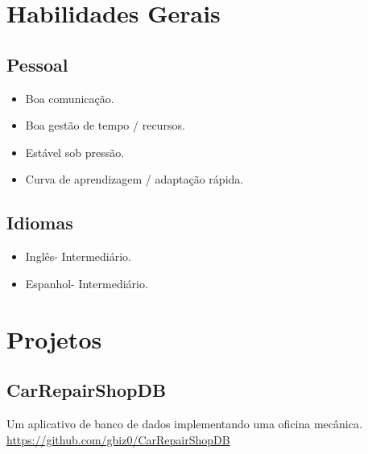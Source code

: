 \documentclass[16pt]{article}
\begin{document}
  \section{Habilidades Gerais}
    \begin{minipage}[t]{0.47\linewidth}
      \subsection{Pessoal}
        \begin{itemize}
          \item{Boa comunicação.}
          \item{Boa gestão de tempo / recursos.}
          \item{Estável sob pressão.}
          \item{Curva de aprendizagem / adaptação rápida.}
        \end{itemize}
    \end{minipage}
    \hfill\vline\hfill
    \begin{minipage}[t]{0.5\linewidth}
      \subsection{Idiomas}
        \begin{itemize}
          \item{Inglês\hspace{2em}- Intermediário.}
          \item{Espanhol\hspace{1.84em}- Intermediário.}
        \end{itemize}
    \end{minipage}
  \section{Projetos}
    \hfill\vline\hfill
    \begin{minipage}[t]{0.47\linewidth}
      \subsection{CarRepairShopDB}
        Um aplicativo de banco de dados implementando uma oficina mecânica.\\

        \url{https://github.com/gbiz0/CarRepairShopDB}\\

    \end{minipage}
    
\end{document}
